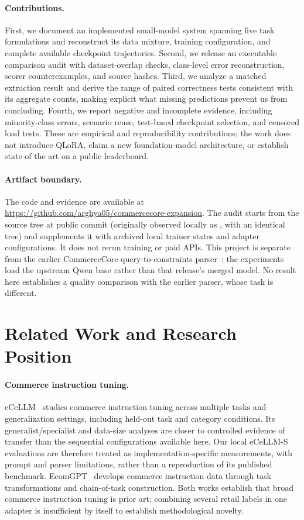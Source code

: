 \paragraph{Contributions.}
First, we document an implemented small-model system spanning five task formulations and reconstruct its data mixture, training configuration, and complete available checkpoint trajectories. Second, we release an executable comparison audit with dataset-overlap checks, class-level error reconstruction, scorer counterexamples, and source hashes. Third, we analyze a matched extraction result and derive the range of paired correctness tests consistent with its aggregate counts, making explicit what missing predictions prevent us from concluding. Fourth, we report negative and incomplete evidence, including minority-class errors, scenario reuse, test-based checkpoint selection, and censored load tests. These are empirical and reproducibility contributions; the work does not introduce QLoRA, claim a new foundation-model architecture, or establish state of the art on a public leaderboard.

\paragraph{Artifact boundary.}
The code and evidence are available at \url{https://github.com/arghya05/commercecore-expansion}. The audit starts from the source tree at public commit  (originally observed locally as , with an identical tree) and supplements it with archived local trainer states and adapter configurations. It does not rerun training or paid APIs. This project is separate from the earlier CommerceCore query-to-constraints parser~\cite{commercecore}: the experiments load the upstream Qwen base rather than that release's merged model. No result here establishes a quality comparison with the earlier parser, whose task is different.

\section{Related Work and Research Position}
\label{sec:related}
\paragraph{Commerce instruction tuning.}
eCeLLM~\cite{ecellm} studies commerce instruction tuning across multiple tasks and generalization settings, including held-out task and category conditions. Its generalist/specialist and data-size analyses are closer to controlled evidence of transfer than the sequential configurations available here. Our local eCeLLM-S evaluations are therefore treated as implementation-specific measurements, with prompt and parser limitations, rather than a reproduction of its published benchmark. EcomGPT~\cite{ecomgpt} develops commerce instruction data through task transformations and chain-of-task construction. Both works establish that broad commerce instruction tuning is prior art; combining several retail labels in one adapter is insufficient by itself to establish methodological novelty.

